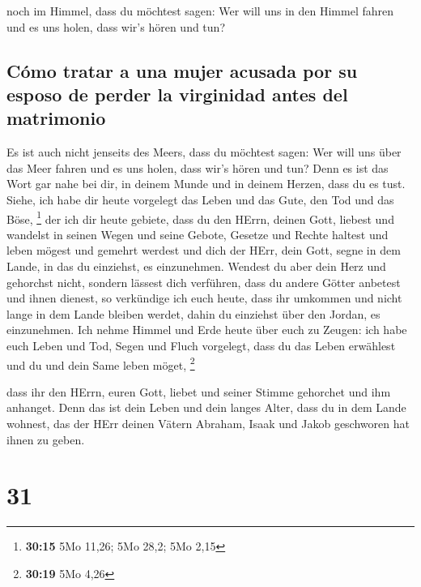  noch im Himmel, dass du möchtest sagen: Wer will uns in
den Himmel fahren und es uns holen, dass wir's hören und tun?

\hypertarget{cuxf3mo-tratar-a-una-mujer-acusada-por-su-esposo-de-perder-la-virginidad-antes-del-matrimonio}{%
\subsection{Cómo tratar a una mujer acusada por su esposo de perder la
virginidad antes del
matrimonio}\label{cuxf3mo-tratar-a-una-mujer-acusada-por-su-esposo-de-perder-la-virginidad-antes-del-matrimonio}}

 Es ist auch nicht jenseits des Meers, dass du möchtest
sagen: Wer will uns über das Meer fahren und es uns holen, dass wir's
hören und tun?  Denn es ist das Wort gar nahe bei dir, in
deinem Munde und in deinem Herzen, dass du es tust. 
Siehe, ich habe dir heute vorgelegt das Leben und das Gute, den Tod und
das Böse, \footnote{\textbf{30:15} 5Mo 11,26; 5Mo 28,2; 5Mo 2,15}
 der ich dir heute gebiete, dass du den HErrn, deinen
Gott, liebest und wandelst in seinen Wegen und seine Gebote, Gesetze und
Rechte haltest und leben mögest und gemehrt werdest und dich der HErr,
dein Gott, segne in dem Lande, in das du einziehst, es einzunehmen.
 Wendest du aber dein Herz und gehorchst nicht, sondern
lässest dich verführen, dass du andere Götter anbetest und ihnen
dienest,  so verkündige ich euch heute, dass ihr umkommen
und nicht lange in dem Lande bleiben werdet, dahin du einziehst über den
Jordan, es einzunehmen.  Ich nehme Himmel und Erde heute
über euch zu Zeugen: ich habe euch Leben und Tod, Segen und Fluch
vorgelegt, dass du das Leben erwählest und du und dein Same leben möget,
\footnote{\textbf{30:19} 5Mo 4,26}

 dass ihr den HErrn, euren Gott, liebet und seiner Stimme
gehorchet und ihm anhanget. Denn das ist dein Leben und dein langes
Alter, dass du in dem Lande wohnest, das der HErr deinen Vätern Abraham,
Isaak und Jakob geschworen hat ihnen zu geben.

\hypertarget{section-30}{%
\section{31}\label{section-30}}


